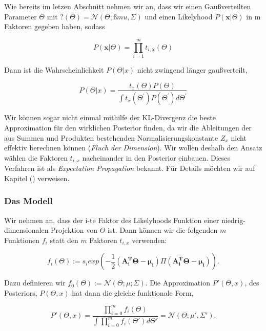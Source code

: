 \documentclass[12pt,a4paper]{scrartcl}
\numberwithin{equation}{section}
\begin{document}
Wie bereits im letzen Abschnitt nehmen wir an, dass wir einen Gaußverteilten Parameter $\Theta$ mit 
$?(\Theta) = \mathcal{N}(\Theta; ßmu, \varSigma)$ und einen Likelyhood $P(\mathbf{x}|\Theta)$ in m Faktoren gegeben haben,
sodass 

\begin{equation}
 P(\mathbf{x}|\Theta) = \prod_{i=1}^m t_{i,\mathbf{x}}(\Theta)
\end{equation}

Dann ist die Wahrscheinlichkeit $P(\varTheta|x)$ nicht zwingend länger gaußverteilt, 

\begin{equation}
  P(\varTheta|x) = \frac{t_x(\varTheta)P(\varTheta)}{\int t_x(\varTheta^{'})P(\varTheta^{'})d\varTheta^{'}}
\end{equation}

Wir können sogar nicht einmal mithilfe der KL-Divergenz die beste Approximation für den wirklichen Posterior finden, 
da wir die Ableitungen der aus Summen und Produkten bestehenden Normalisierungskonstante $Z_x$ nicht effektiv
berechnen können (\textit{Fluch der Dimension}). Wir wollen deshalb den Ansatz wählen die Faktoren 
$t_{i,x}$ nacheinander in den Posterior einbauen. Dieses Verfahren ist als \textit{Expectation Propagation} bekannt. 
Für Details möchten wir auf Kapitel () verweisen. 

\subsubsection{Das Modell}

Wir nehmen an, dass der i-te Faktor des Likelyhoods Funktion einer niedrig-dimensionalen Projektion von $\Theta$ ist. 
Dann können wir die folgenden $m$ Funktionen $f_i$ statt den $m$ Faktoren $t_{i,x}$ verwenden:

\begin{equation}
 f_i(\Theta) := s_i exp(- \frac{1}{2} (\mathbf{A_i^T \Theta - \mu_i}) \Pi (\mathbf{A_i^T \Theta - \mu_i})).
\end{equation}

Dazu definieren wir $f_0(\Theta) := \mathcal{N}(\Theta; \mu; \varSigma)$. Die Approximation $P'(\Theta,x)$, des Posteriors, $P(\Theta,x)$ hat dann
die gleiche funktionale Form, 

\begin{equation}
 P'(\Theta,x) = \frac{ \prod_{i=0}^m f_i(\Theta)}{ \int \prod_{i=0}^m f_i(\Theta') d \Theta' } = \mathcal{N}(\Theta; \mu', \varSigma').
\end{equation}
\end{document}
